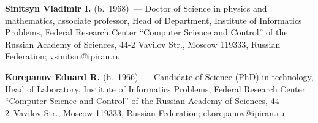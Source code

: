 \noindent
\textbf{Sinitsyn Vladimir I.} (b.\ 1968)~---
 Doctor of Science in physics and mathematics,
associate professor, Head of Department, Institute of Informatics Problems, Federal Research Center ``Computer Science and
Control'' of the Russian Academy of Sciences, 44-2 Vavilov Str.,
Moscow 119333, Russian Federation; vsinitsin@ipiran.ru

\vspace*{3pt}

\noindent
\textbf{Korepanov Eduard R.} (b.\ 1966)~---
Candidate of Science (PhD) in technology, 
Head of Laboratory, Institute of Informatics Problems, Federal Research Center 
``Computer Science and Control'' of the Russian Academy of Sciences, 
44-2~Vavilov Str., Moscow 119333, Russian Federation; ekorepanov@ipiran.ru 

\label{end\stat}


\renewcommand{\bibname}{\protect\rm Литература}